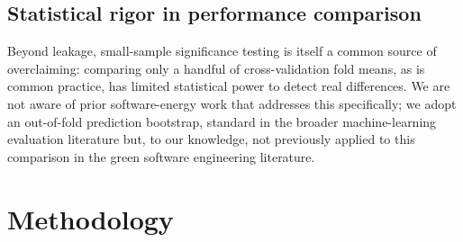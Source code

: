 \documentclass[preprint,12pt]{elsarticle}
\begin{document}
\begin{table}[htbp]
\centering
\caption{Positioning of this study against the most closely related prior work.}
\label{tab:related}
\end{table}

\subsection{Statistical rigor in performance comparison}
Beyond leakage, small-sample significance testing is itself a common source of overclaiming: comparing only a handful of cross-validation fold means, as is common practice, has limited statistical power to detect real differences. We are not aware of prior software-energy work that addresses this specifically; we adopt an out-of-fold prediction bootstrap, standard in the broader machine-learning evaluation literature but, to our knowledge, not previously applied to this comparison in the green software engineering literature.

\section{Methodology}
\label{sec:method}
\end{document}
